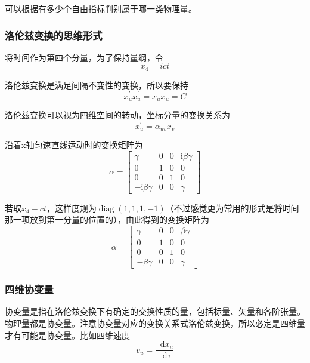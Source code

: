 \documentclass[UTF8]{ctexart}
\newcommand*{\dif}{\mathop{}\!\mathrm{d}}
\begin{document}
    可以根据有多少个自由指标判别属于哪一类物理量。

    \subsubsection{洛伦兹变换的思维形式}
    将时间作为第四个分量，为了保持量纲，令
    \begin{equation}
        x_4 = i c t
    \end{equation}

\noindent 洛伦兹变换是满足间隔不变性的变换，所以要保持
\begin{equation}
    x^{\prime}_u x^{\prime}_u = x_u x_u =C
\end{equation}

    洛伦兹变换可以视为四维空间的转动，坐标分量的变换关系为
    \begin{equation}
        x^{\prime}_u = \alpha_{uv}x_v
    \end{equation}

\noindent 沿着x轴匀速直线运动时的变换矩阵为
\begin{equation}
\alpha=\left[\begin{array}{cccc}{\gamma} & {0} & {0} & {\mathrm{i} \beta \gamma} \\ {0} & {1} & {0} & {0} \\ {0} & {0} & {1} & {0} \\ {-\mathrm{i} \beta \gamma} & {0} & {0} & {\gamma}\end{array}\right]
\end{equation}

\noindent 若取$x_4 - ct$，这样度规为$\operatorname{diag}(1,1,1,-1)$（不过感觉更为常用的形式是将时间那一项放到第一分量的位置的），由此得到的变换矩阵为
\begin{equation}
\alpha=\left[\begin{array}{cccc}{\gamma} & {0} & {0} & { \beta \gamma} \\ {0} & {1} & {0} & {0} \\ {0} & {0} & {1} & {0} \\ {- \beta \gamma} & {0} & {0} & {\gamma}\end{array}\right]
\end{equation}

    \subsubsection{四维协变量}
    协变量是指在洛伦兹变换下有确定的交换性质的量，包括标量、矢量和各阶张量。物理量都是协变量。注意协变量对应的变换关系式洛伦兹变换，所以必定是四维量才有可能是协变量。比如四维速度
    \begin{equation}
        v_u = \frac{\dif x_u}{\dif \tau}
    \end{equation}
\end{document}
